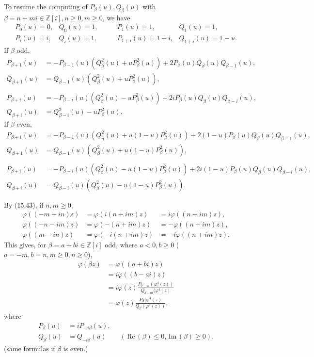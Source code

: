 \documentclass[11pt,a4paper]{article}
\newcommand{\Z}{\mathbb{Z}}
\newcommand{\re}{\,\mathrm{Re}\,}
\newcommand{\im}{\,\mathrm{Im}\,}
\begin{document}
To resume the computing of $P_\beta(u), Q_\beta(u)$ with $\beta = n + mi \in \Z[i], n\geq 0, m \geq 0$, we have
$$\begin{array}{llll}
P_0(u) = 0, &Q_0(u) = 1, &\qquad P_1(u) = 1, &Q_{1}(u) = 1,\\
P_i(u) = i, &Q_i(u) = 1, &\qquad P_{1+i}(u) = 1+i, &Q_{1+i}(u) = 1-u.
\end{array}
$$
If $\beta$ odd,
\begin{align*}
P_{\beta + 1}(u) &= -P_{\beta - 1}(u) (Q_{\beta}^2(u) + u P_{\beta}^2(u)) + 2 P_{\beta}(u)Q_{\beta}(u) Q_{\beta - 1}(u),\\
Q_{\beta + 1}(u) &=Q_{\beta - 1}(u)(Q_{\beta}^2(u) + u P_{\beta}^2(u)),\\
\\
P_{\beta + i}(u) &= -P_{\beta - i}(u)(Q_{\beta}^2(u) - u P_{\beta}^2(u)) + 2i P_{\beta}(u) Q_{\beta}(u) Q_{\beta -i}(u),\\
Q_{\beta + i}(u) &= Q_{\beta - i}^2(u) - u P_{\beta}^2(u).
\end{align*}
If $\beta$ even,
\begin{align*}
P_{\beta + 1}(u) &= -P_{\beta - 1}(u) (Q_n^2(u) + u(1-u) P_{\beta}^2(u)) + 2(1-u) P_{\beta}(u)Q_{\beta}(u) Q_{\beta - 1}(u),\\
Q_{\beta + 1}(u) &=Q_{\beta - 1}(u)(Q_{\beta}^2(u) + u(1-u) P_{\beta}^2(u)),\\
\\
P_{\beta + i}(u) &= -P_{\beta - i}(u) ( Q_{\beta}^2(u) - u(1-u)P_{\beta}^2(u)) + 2i(1 - u) P_{\beta}(u) Q_{\beta}(u) Q_{\beta - i}(u),\\
Q_{\beta + i}(u) &=Q_{\beta - i}(u) (Q_{\beta}^2(u) - u(1-u) P_{\beta}^2(u)).
\end{align*}

By (15.43), if $n,m\geq 0$,
$$
\begin{array}{lll}
\varphi((-m+in)z) &= \varphi(i(n+im)z) &= i \varphi((n+im)z),\\
\varphi((-n-im)z) &= \varphi(-(n+im)z) &= -\varphi((n+im)z),\\
\varphi((m-in)z) &= \varphi(-i(n+im)z) &= -i\varphi((n+im)z).
\end{array}
$$
This gives, for $\beta = a + bi \in \Z[i]$ odd, where $a <0, b \geq 0$ ($a = -m, b = n, m\geq 0, n \geq 0$),
\begin{align*}
\varphi(\beta z) &= \varphi((a+bi)z)\\
&= i \varphi((b-ai)z)\\
&=i \varphi(z) \frac{P_{b-ai}(\varphi^4(z))}{Q_{b-ai}(\varphi^4(z)}\\
&= \varphi(z) \frac{P_\beta(\varphi^4(z)}{Q_\beta(\varphi^4(z))},
\end{align*}
where 
\begin{align*}
P_\beta(u) &= i P_{-i\beta}(u),\\
Q_\beta(u) &= Q_{-i\beta}(u) \qquad (\re(\beta)\leq 0, \im(\beta)\geq 0).
\end{align*}
(same formulas if $\beta$ is even.)
\end{document}
